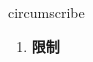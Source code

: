 
\begin{frame}
{\huge circumscribe}
\begin{center}
\begin{enumerate}\Large
  \item \textbf{限制}
\end{enumerate}
\end{center}
\end{frame}
